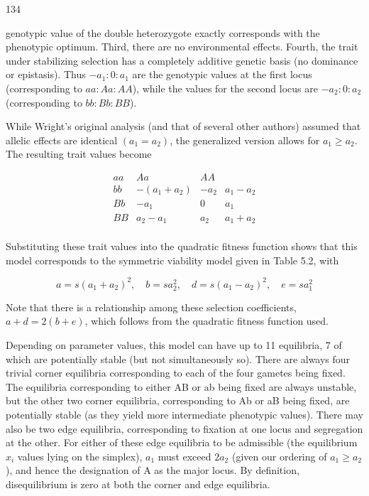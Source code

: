\documentclass{article}
\begin{document}
134

genotypic value of the double heterozygote exactly corresponds with the phenotypic optimum. Third, there are no environmental effects. Fourth, the trait under stabilizing selection has a completely additive genetic basis (no dominance or epistasis). Thus  $ -a_1 : 0 : a_1 $ are the genotypic values at the first locus (corresponding to  $ aa : Aa : AA $), while the values for the second locus are  $ -a_2 : 0 : a_2 $ (corresponding to  $ bb : Bb : BB $).

While Wright's original analysis (and that of several other authors) assumed that allelic effects are identical  $ (a_1 = a_2) $, the generalized version allows for  $ a_1 \geq a_2 $. The resulting trait values become

\begin{equation}
\begin{array}{cccc}a a&A a&A A\\ b b&-(a_{1}+a_{2})&-a_{2}&a_{1}-a_{2}\\ B b&-a_{1}&0&a_{1}\\ B B&a_{2}-a_{1}&a_{2}&a_{1}+a_{2}\\\end{array}
\end{equation}

Substituting these trait values into the quadratic fitness function shows that this model corresponds to the symmetric viability model given in Table 5.2, with

\begin{equation}
a=s(a_{1}+a_{2})^{2},\quad b=sa_{2}^{2},\quad d=s(a_{1}-a_{2})^{2},\quad e=sa_{1}^{2}
\end{equation}

Note that there is a relationship among these selection coefficients,  $ a + d = 2(b + e) $, which follows from the quadratic fitness function used.

Depending on parameter values, this model can have up to 11 equilibria, 7 of which are potentially stable (but not simultaneously so). There are always four trivial corner equilibria corresponding to each of the four gametes being fixed. The equilibria corresponding to either AB or ab being fixed are always unstable, but the other two corner equilibria, corresponding to Ab or aB being fixed, are potentially stable (as they yield more intermediate phenotypic values). There may also be two edge equilibria, corresponding to fixation at one locus and segregation at the other. For either of these edge equilibria to be admissible (the equilibrium  $ x_i $ values lying on the simplex),  $ a_1 $ must exceed  $ 2a_2 $ (given our ordering of  $ a_1 \geq a_2 $), and hence the designation of A as the major locus. By definition, disequilibrium is zero at both the corner and edge equilibria.
\end{document}
